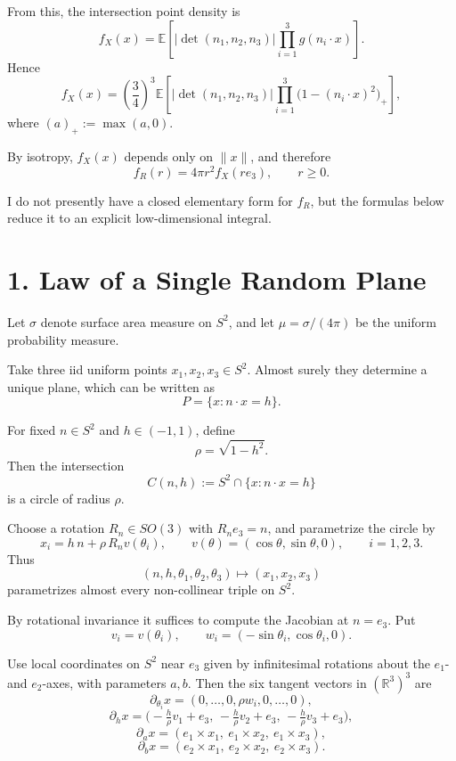\documentclass[11pt]{article}
\begin{document}
From this, the intersection point density is
\[
f_X(x)
=
\mathbb{E}\!\left[
\left|\det(n_1,n_2,n_3)\right|
\prod_{i=1}^3 g(n_i \cdot x)
\right].
\]
Hence
\[
f_X(x)
=
\left(\frac{3}{4}\right)^3
\mathbb{E}\!\left[
\left|\det(n_1,n_2,n_3)\right|
\prod_{i=1}^3 \bigl(1-(n_i \cdot x)^2\bigr)_+
\right],
\]
where $(a)_+ := \max(a,0)$.

By isotropy, $f_X(x)$ depends only on $\|x\|$, and therefore
\[
f_R(r) = 4\pi r^2 f_X(re_3), \qquad r \ge 0.
\]

I do not presently have a closed elementary form for $f_R$, but the formulas below reduce it to an
explicit low-dimensional integral.

\section*{1. Law of a Single Random Plane}

Let $\sigma$ denote surface area measure on $S^2$, and let $\mu = \sigma/(4\pi)$ be the uniform
probability measure.

Take three iid uniform points $x_1,x_2,x_3 \in S^2$. Almost surely they determine a unique plane,
which can be written as
\[
P = \{x : n \cdot x = h\}.
\]

For fixed $n \in S^2$ and $h \in (-1,1)$, define
\[
\rho = \sqrt{1-h^2}.
\]
Then the intersection
\[
C(n,h) := S^2 \cap \{x : n \cdot x = h\}
\]
is a circle of radius $\rho$.

Choose a rotation $R_n \in SO(3)$ with $R_n e_3 = n$, and parametrize the circle by
\[
x_i = h\,n + \rho\,R_n v(\theta_i),
\qquad
v(\theta) = (\cos\theta,\sin\theta,0),
\qquad i=1,2,3.
\]
Thus
\[
(n,h,\theta_1,\theta_2,\theta_3) \mapsto (x_1,x_2,x_3)
\]
parametrizes almost every non-collinear triple on $S^2$.

By rotational invariance it suffices to compute the Jacobian at $n=e_3$. Put
\[
v_i = v(\theta_i), \qquad w_i = (-\sin\theta_i,\cos\theta_i,0).
\]

Use local coordinates on $S^2$ near $e_3$ given by infinitesimal rotations about the $e_1$- and
$e_2$-axes, with parameters $a,b$. Then the six tangent vectors in $(\mathbb{R}^3)^3$ are
\[
\partial_{\theta_i}x
=
(0,\dots,0,\rho w_i,0,\dots,0),
\]
\[
\partial_h x
=
\bigl(-\tfrac{h}{\rho}v_1+e_3,\,-\tfrac{h}{\rho}v_2+e_3,\,-\tfrac{h}{\rho}v_3+e_3\bigr),
\]
\[
\partial_a x
=
(e_1 \times x_1,\ e_1 \times x_2,\ e_1 \times x_3),
\]
\[
\partial_b x
=
(e_2 \times x_1,\ e_2 \times x_2,\ e_2 \times x_3).
\]
\end{document}
